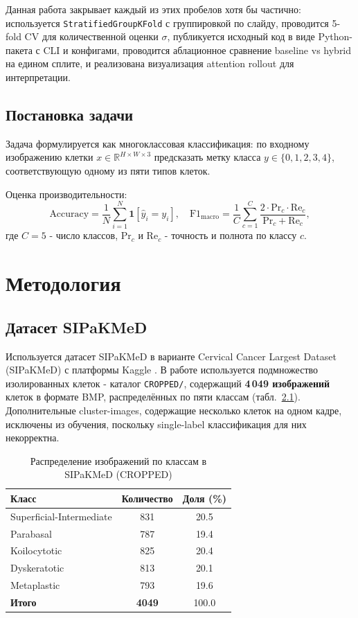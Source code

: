 \documentclass[14pt,a4paper]{extreport}
\begin{document}
Данная работа закрывает каждый из этих пробелов хотя бы частично:
используется \texttt{StratifiedGroupKFold} с группировкой по слайду,
проводится 5-fold CV для количественной оценки $\sigma$, публикуется
исходный код в виде Python-пакета с CLI и конфигами, проводится
аблационное сравнение baseline vs hybrid на едином сплите, и реализована
визуализация attention rollout для интерпретации.

\section{Постановка задачи}

Задача формулируется как многоклассовая классификация: по входному изображению
клетки $x \in \mathbb{R}^{H \times W \times 3}$ предсказать метку класса
$y \in \{0,1,2,3,4\}$, соответствующую одному из пяти типов клеток.

Оценка производительности:
\[
    \text{Accuracy} = \frac{1}{N}\sum_{i=1}^{N}\mathbf{1}[\hat{y}_i = y_i],
    \quad
    \text{F1}_{\text{macro}} = \frac{1}{C}\sum_{c=1}^{C}
        \frac{2 \cdot \text{Pr}_c \cdot \text{Re}_c}
             {\text{Pr}_c + \text{Re}_c},
\]
где $C=5$ - число классов, $\text{Pr}_c$ и $\text{Re}_c$ - точность и
полнота по классу $c$.

\chapter{Методология}
\label{ch:methodology}

\section{Датасет SIPaKMeD}

Используется датасет SIPaKMeD \cite{plissiti2018sipakmed} в варианте
Cervical Cancer Largest Dataset (SIPaKMeD) с платформы Kaggle
\cite{kaggle_sipakmed}. В работе используется подмножество изолированных
клеток - каталог \texttt{CROPPED/}, содержащий \textbf{4\,049 изображений}
клеток в формате BMP, распределённых по пяти классам
(табл.~\ref{tab:dataset}). Дополнительные cluster-images, содержащие
несколько клеток на одном кадре, исключены из обучения, поскольку
single-label классификация для них некорректна.

\begin{table}[H]
\centering
\caption{Распределение изображений по классам в SIPaKMeD (CROPPED)}
\label{tab:dataset}
\begin{tabular}{lcc}
\toprule
Класс & Количество & Доля (\%) \\
\midrule
Superficial-Intermediate & 831  & 20.5 \\
Parabasal                & 787  & 19.4 \\
Koilocytotic             & 825  & 20.4 \\
Dyskeratotic             & 813  & 20.1 \\
Metaplastic              & 793  & 19.6 \\
\midrule
\textbf{Итого}           & \textbf{4049} & 100.0 \\
\bottomrule
\end{tabular}
\end{table}
\end{document}
